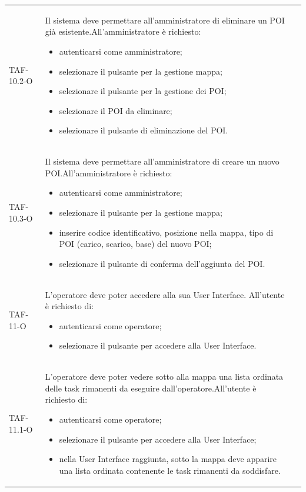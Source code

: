 \begin{longtable}{ >{\centering}p{} >{}p{}
		>{\centering}p{}}
	TAF-10.2-O & Il sistema deve permettare all'amministratore di eliminare un POI già esistente.\newline All'amministratore è richiesto: \begin{itemize}\item autenticarsi come amministratore; \item selezionare il pulsante per la gestione mappa; \item selezionare il pulsante per la gestione dei POI; \item selezionare il POI da eliminare; \item selezionare il pulsante di eliminazione del POI.\end{itemize} & 0\tabularnewline
	
	TAF-10.3-O & Il sistema deve permettare all'amministratore di creare un nuovo POI.\newline All'amministratore è richiesto: \begin{itemize}\item autenticarsi come amministratore; \item selezionare il pulsante per la gestione mappa; \item inserire codice identificativo, posizione nella mappa, tipo di POI (carico, scarico, base) del nuovo POI; \item selezionare il pulsante di conferma dell'aggiunta del POI.\end{itemize} & 0\tabularnewline
	
	TAF-11-O & L'operatore deve poter accedere alla sua User Interface. All'utente è richiesto di: \begin{itemize} \item autenticarsi come operatore; \item selezionare il pulsante per accedere alla User Interface.\end{itemize} & 0\tabularnewline
	
	TAF-11.1-O & L'operatore deve poter vedere sotto alla mappa una lista ordinata delle task rimanenti da eseguire dall'operatore.\newline All'utente è richiesto di: \begin{itemize} \item autenticarsi come operatore; \item selezionare il pulsante per accedere alla User Interface; \item nella User Interface raggiunta, sotto la mappa deve apparire una lista ordinata contenente le task rimanenti da soddisfare.\end{itemize} & 0\tabularnewline
	

\end{longtable}
